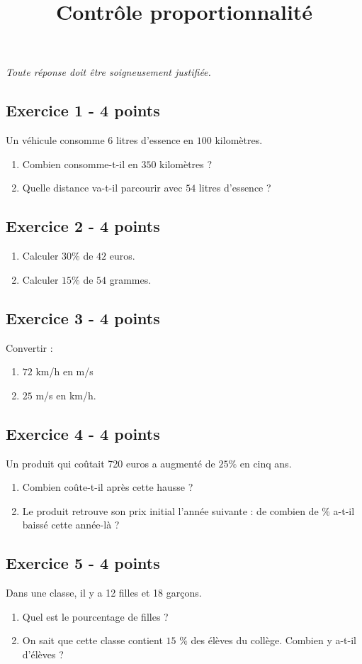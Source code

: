 \documentclass[14 pt]{extarticle}
\title{Contrôle proportionnalité}
\date{}
\theoremstyle{plain}
\begin{document}
\emph{Toute réponse doit être soigneusement justifiée.}
 \subsection*{Exercice 1 - 4 points}
Un véhicule consomme $6$ litres d'essence en $100$ kilomètres. \begin{enumerate}
 \item Combien consomme-t-il en $350$ kilomètres ? 
 \item Quelle distance va-t-il parcourir avec $54$ litres d'essence ?
 \end{enumerate}
 \subsection*{Exercice 2 - 4 points}
 \begin{enumerate}
 \item  Calculer $30\%$ de $42$ euros. 
 \item  Calculer $15\%$ de $54$ grammes. 
 \end{enumerate}
 
 \subsection*{Exercice 3 - 4 points}
 Convertir :
 \begin{enumerate}
 \item $72$ km/h en m/s
 \item $25$ m/s en km/h.
 \end{enumerate}
 
 
 \subsection*{Exercice 4 - 4 points}
 
 Un produit qui coûtait 720 euros a augmenté de $25\%$ en cinq ans.
 \begin{enumerate}
 \item Combien coûte-t-il après cette hausse ?
 \item Le produit retrouve son prix initial l'année suivante : de combien de \% a-t-il baissé cette année-là ?
 \end{enumerate}
 \subsection*{Exercice 5 - 4 points}
Dans une classe, il y  a 12 filles et 18 garçons.
\begin{enumerate}
\item  Quel est le pourcentage de filles ?
\item On sait que cette classe contient $15$ \% des élèves du collège. Combien y a-t-il d'élèves ? 
\end{enumerate}
\end{document}
